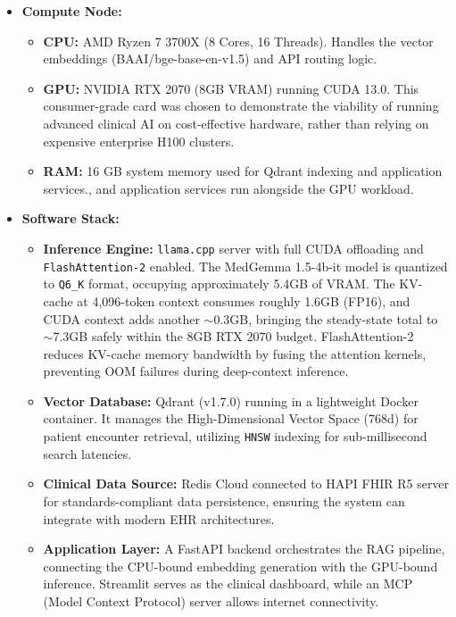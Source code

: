 \begin{itemize}
    \item \textbf{Compute Node:}
    \begin{itemize}
        \item \textbf{CPU:} AMD Ryzen 7 3700X (8 Cores, 16 Threads). Handles the vector embeddings (BAAI/bge-base-en-v1.5) and API routing logic.
        \item \textbf{GPU:} NVIDIA RTX 2070 (8GB VRAM) running CUDA 13.0. This consumer-grade card was chosen to demonstrate the viability of running advanced clinical AI on cost-effective hardware, rather than relying on expensive enterprise H100 clusters.
        \item \textbf{RAM:} 16 GB system memory used for Qdrant indexing and application services., and application services run alongside the GPU workload.
    \end{itemize}

    \item \textbf{Software Stack:}
    \begin{itemize}
        \item \textbf{Inference Engine:} \texttt{llama.cpp} server with full CUDA offloading and \texttt{FlashAttention-2} enabled. The MedGemma 1.5-4b-it model is quantized to \texttt{Q6\_K} format, occupying approximately 5.4GB of VRAM. The KV-cache at 4,096-token context consumes roughly 1.6GB (FP16), and CUDA context adds another $\sim$0.3GB, bringing the steady-state total to $\sim$7.3GB   safely within the 8GB RTX 2070 budget. FlashAttention-2 reduces KV-cache memory bandwidth by fusing the attention kernels, preventing OOM failures during deep-context inference.
        \item \textbf{Vector Database:} Qdrant (v1.7.0) running in a lightweight Docker container. It manages the High-Dimensional Vector Space (768d) for patient encounter retrieval, utilizing \texttt{HNSW} indexing for sub-millisecond search latencies.
        \item \textbf{Clinical Data Source:} Redis Cloud connected to HAPI FHIR R5 server for standards-compliant data persistence, ensuring the system can integrate with modern EHR architectures.
        \item \textbf{Application Layer:} A FastAPI backend orchestrates the RAG pipeline, connecting the CPU-bound embedding generation with the GPU-bound inference. Streamlit serves as the clinical dashboard, while an MCP (Model Context Protocol) server allows internet connectivity.
    \end{itemize}
\end{itemize}


